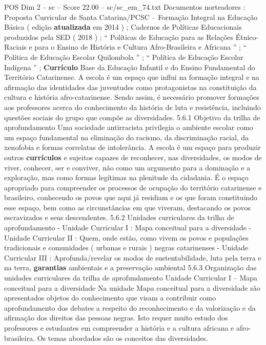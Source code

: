 \begin{textsample}{POS Dim 2 – sc – Score 22.00 – sc/sc\_em\_74.txt}
Documentos norteadores : Proposta Curricular de Santa Catarina/PCSC – Formação Integral na Educação Básica ( edição \textbf{atualizada} em 2014 ) ; Cadernos de Políticas Educacionais produzidos pela SED ( 2018 ) ; “ Políticas de Educação para as Relações Étnico-Raciais e para o Ensino de História e Cultura Afro-Brasileira e Africana ” ; “ Política de Educação Escolar Quilombola ” ; “ Política de Educação Escolar Indígena ” ; \textbf{Currículo} Base da Educação Infantil e do Ensino Fundamental do Território Catarinense.
A escola é um espaço que influi na formação integral e na afirmação das identidades das juventudes como protagonistas na constituição da cultura e história afro-catarinense.
Sendo assim, é necessário promover formações aos professores acerca do conhecimento da história de luta e resistência, incluindo questões sociais do grupo que compõe as diversidades. 5.6.1 Objetivo da trilha de aprofundamento Uma sociedade antirracista privilegia o ambiente escolar como um espaço fundamental na eliminação do racismo, da discriminação racial, da xenofobia e formas correlatas de intolerância.
A escola é um espaço para produzir outros \textbf{currículos} e sujeitos capazes de reconhecer, nas diversidades, os modos de viver, conhecer, ser e conviver, não como um argumento para a dominação e a exploração, mas como formas legítimas na plenitude da cidadania.
É o espaço apropriado para compreender os processos de ocupação do território catarinense e brasileiro, conhecendo os povos que aqui já residiam e os que foram constituindo esse espaço, bem como as circunstâncias em que viveram, destacando os povos escravizados e seus descendentes. 5.6.2 Unidades curriculares da trilha de aprofundamento - Unidade Curricular I : Mapa conceitual para a diversidade - Unidade Curricular II : Quem, onde estão, como vivem os povos e populações tradicionais e comunidades ( urbanas e rurais ) negras catarinenses - Unidade Curricular III : Aprofunda/revelar os modos de sustentabilidade, luta pela terra e na terra, \textbf{garantias} ambientais e a preservação ambiental 5.6.3 Organização das unidades curriculares da trilha de aprofundamento Unidade Curricular I – Mapa conceitual para a diversidade Na unidade Mapa conceitual para a diversidade são apresentados objetos do conhecimento que visam a contribuir como aprofundamento dos debates a respeito do reconhecimento e da valorização e da afirmação dos direitos das pessoas negras.
Isto requer muito estudo dos professores e estudantes em compreender a história e a cultura africana e afro-brasileira.
Os temas abordados são os conceitos das diversidades.

\end{textsample}
